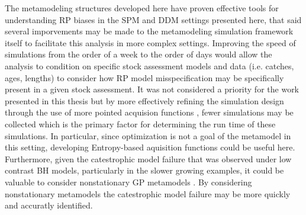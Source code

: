\documentclass[12pt]{ucscthesis}
\begin{document}
%
The metamodeling structures developed here have proven effective tools for understanding RP biases 
in the SPM and DDM settings presented here, that said several imporvements may be made to the metamodeling 
simulation framework itself to facilitate this analysis in more complex settings. Improving the speed 
of simulations from the order of a week to the order of days would allow the analysis to condition 
on specific stock assessment models and data (i.e. catches, ages, lengths) to consider how RP model 
misspecification may be specifically present in a given stock assessment. It was not considered a priority 
for the work presented in this thesis but by more effectively refining the simulation design through the 
use of more pointed acquision functions \cite{pourmohamad_bayesian_2021}, fewer simulations may be collected 
which is the primary factor for determining the run time of these simulations. In particular, since 
optimization is not a goal of the metamodel in this setting, developing Entropy-based aquisition functions 
\cite{hennig_entropy_2012, hernandez-lobato_predictive_2014} could be useful here. Furthermore, given the 
catestrophic model failure that was observed under low contrast BH models, particularly in the slower growing examples, 
it could be valuable to consider nonstationary GP metamodels \cite{gramacy_bayesian_2008, binois_hetgp_2021, heinonen_non-stationary_2016}. 
By considering nonstationary metamodels the catestrophic model failure may be more quickly and accuratly 
identified.


\end{document}
